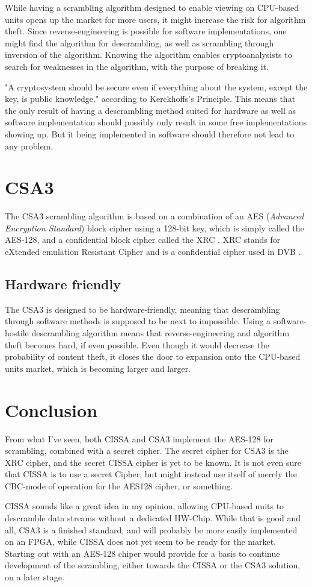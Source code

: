 While having a scrambling algorithm designed to enable viewing on CPU-based units
opens up the market for more users, it might increase the risk for algorithm 
theft. Since reverse-engineering is possible for software implementations, one 
might find the algorithm for descrambling, as well as scrambling through 
inversion of the algorithm. Knowing the algorithm enables cryptoanalysists to 
search for weaknesses in the algorithm, with the purpose of breaking it.

"A cryptosystem should be secure even if everything about the system, except the 
key, is public knowledge." according to Kerckhoffs's Principle.
This means that the only result of having a descrambling method suited for 
hardware as well as software implementation should possibly only result in some 
free implementations showing up. But it being implemented in software should 
therefore not lead to any problem.

\section{CSA3}
The CSA3 scrambling algorithm is based on a combination of an AES 
(\emph{Advanced Encryption Standard}) block cipher using a 128-bit key, which is 
simply called the AES-128, and a confidential block cipher called the XRC 
\citep[p. 8]{DVB:2013}. XRC stands for eXtended emulation Resistant Cipher and 
is a confidential cipher used in DVB \citep[p. 8]{DVB:2013}.

\subsection{Hardware friendly}
The CSA3 is designed to be hardware-friendly, meaning that descrambling through 
software methods is supposed to be next to impossible. Using a software-hostile 
descrambling algorithm means that reverse-engineering and algorithm theft becomes
hard, if even possible. Even though it would decrease the probability of content 
theft, it closes the door to expansion onto the CPU-based units market, which is 
becoming larger and larger.

\section{Conclusion}
From what I've seen, both CISSA and CSA3 implement the AES-128 for scrambling, 
combined with a secret cipher. The secret cipher for CSA3 is the XRC cipher, and 
the secret CISSA cipher is yet to be known. It is not even sure that CISSA is to 
use a secret Cipher, but might instead use itself of merely the CBC-mode of 
operation for the AES128 cipher, or something. 

CISSA sounds like a great idea in my opinion, allowing CPU-based units to 
descramble data streams without a dedicated HW-Chip. While that is good and all, 
CSA3 is a finished standard, and will probably be more easily implemented on an 
FPGA, while CISSA does not yet seem to be ready for the market. Starting out 
with an AES-128 chiper would provide for a basis to continue development of the 
scrambling, either towards the CISSA or the CSA3 solution, on a later stage.
